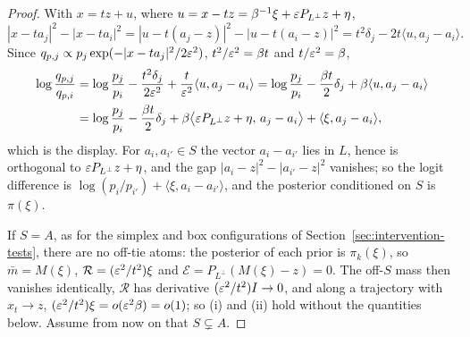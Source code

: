 \documentclass{article} %
\theoremstyle{plain}
\theoremstyle{definition}
\theoremstyle{remark}
\begin{document}
\begin{proof}
With $x=tz+u$, where $u=x-tz=\beta^{-1}\xi+\varepsilon P_{L^\perp}z+\eta$,
\[
|x-ta_j|^2-|x-ta_i|^2=|u-t(a_j-z)|^2-|u-t(a_i-z)|^2=t^2\delta_j-2t\langle u,a_j-a_i\rangle .
\]
Since $q_{p,j}\propto p_j\exp(-|x-ta_j|^2/2\varepsilon^2)$, $t^2/\varepsilon^2=\beta t$ and $t/\varepsilon^2=\beta$,
\begin{align*}
\log\frac{q_{p,j}}{q_{p,i}}
&=\log\frac{p_j}{p_i}-\frac{t^2\delta_j}{2\varepsilon^2}+\frac{t}{\varepsilon^2}\langle u,a_j-a_i\rangle
=\log\frac{p_j}{p_i}-\frac{\beta t}{2}\delta_j+\beta\langle u,a_j-a_i\rangle\\
&=\log\frac{p_j}{p_i}-\frac{\beta t}2\delta_j
+\beta\bigl\langle\varepsilon P_{L^\perp}z+\eta,\,a_j-a_i\bigr\rangle+\langle\xi,a_j-a_i\rangle ,
\end{align*}
which is the display. For $a_i,a_{i'}\in S$ the vector $a_i-a_{i'}$ lies in $L$, hence is orthogonal
to $\varepsilon P_{L^\perp}z+\eta$, and the gap $|a_i-z|^2-|a_{i'}-z|^2$ vanishes; so the logit difference is
$\log(p_i/p_{i'})+\langle\xi,a_i-a_{i'}\rangle$, and the posterior conditioned on $S$ is $\pi(\xi)$.

If $S=A$, as for the simplex and box configurations of Section~\ref{sec:intervention-tests},
there are no off-tie atoms: the posterior of each prior is $\pi_k(\xi)$, so $\bar m=M(\xi)$,
$\mathcal R=(\varepsilon^2/t^2)\xi$ and $\mathcal E=P_{L^\perp}(M(\xi)-z)=0$. The off-$S$ mass then
vanishes identically, $\mathcal R$ has derivative $(\varepsilon^2/t^2)I\to0$, and along a trajectory with
$x_t\to z$, $(\varepsilon^2/t^2)\xi=o(\varepsilon^2\beta)=o(1)$; so (i) and (ii) hold without the quantities
below. Assume from now on that $S\subsetneq A$.


\end{proof}
\end{document}
